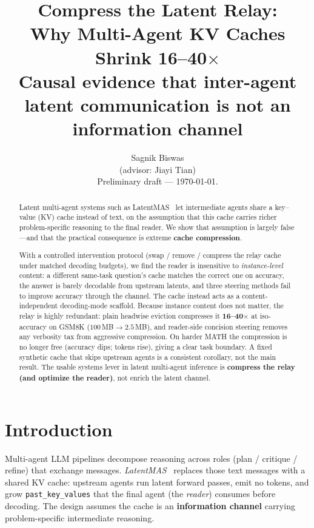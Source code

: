 \documentclass[11pt]{article}
\title{\textbf{Compress the Latent Relay:\\[2pt]
\large Why Multi-Agent KV Caches Shrink 16--40$\times$}\\[4pt]
\large Causal evidence that inter-agent latent communication is not an
information channel}
\author{Sagnik Biswas \\ \small (advisor: Jiayi Tian) \\[4pt]
\small Preliminary draft --- \today.}
\date{}
\begin{document}
\maketitle

\begin{abstract}
Latent multi-agent systems such as LatentMAS~\cite{latentmas} let intermediate
agents share a key--value (KV) cache instead of text, on the assumption that this
cache carries richer problem-specific reasoning to the final reader. We show that
assumption is largely false---and that the practical consequence is extreme
\textbf{cache compression}.

With a controlled intervention protocol (swap / remove / compress the relay
cache under matched decoding budgets), we find the reader is insensitive to
\emph{instance-level} content: a different same-task question's cache matches the
correct one on accuracy, the answer is barely decodable from upstream latents,
and three steering methods fail to improve accuracy through the channel. The
cache instead acts as a content-independent decoding-mode scaffold. Because
instance content does not matter, the relay is highly redundant: plain headwise
eviction compresses it \textbf{16--40$\times$} at iso-accuracy on GSM8K
($100\,$MB$\to 2.5\,$MB), and reader-side concision steering removes any
verbosity tax from aggressive compression. On harder MATH the compression is no
longer free (accuracy dips; tokens rise), giving a clear task boundary. A fixed
synthetic cache that skips upstream agents is a consistent corollary, not the
main result. The usable systems lever in latent multi-agent inference is
\textbf{compress the relay (and optimize the reader)}, not enrich the latent
channel.
\end{abstract}

\section{Introduction}
Multi-agent LLM pipelines decompose reasoning across roles (plan / critique /
refine) that exchange messages. \emph{LatentMAS}~\cite{latentmas} replaces those
text messages with a shared KV cache: upstream agents run latent forward passes,
emit no tokens, and grow \texttt{past\_key\_values} that the final agent (the
\emph{reader}) consumes before decoding. The design assumes the cache is an
\textbf{information channel} carrying problem-specific intermediate reasoning.
\end{document}
